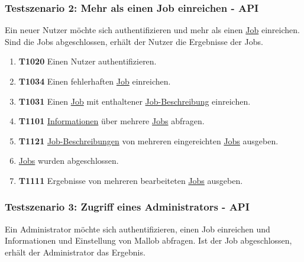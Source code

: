 \subsubsection{Testszenario 2: Mehr als einen Job einreichen - API}
Ein neuer \gls{Nutzer} möchte sich authentifizieren und mehr als einen \hyperref[B:Jobs]{Job} einreichen. Sind die Jobs abgeschlossen, erhält der Nutzer die Ergebnisse der Jobs.

\begin{enumerate}
        
    \item \textbf{T1020} Einen \gls{Nutzer} authentifizieren.
    
    \item \textbf{T1034} Einen fehlerhaften \hyperref[B:Jobs]{Job} einreichen.
        
    \item \textbf{T1031} Einen \hyperref[B:Jobs]{Job} mit enthaltener \hyperref[B:Job-Beschreibung]{Job-Beschreibung} einreichen.
    
    \item \textbf{T1101} \hyperref[B:Job-Informationen]{Informationen} über mehrere \hyperref[B:Jobs]{Jobs} abfragen. 
    
    \item \textbf{T1121} \hyperref[B:Job-Beschreibung]{Job-Beschreibungen} von mehreren eingereichten \hyperref[B:Jobs]{Jobs} ausgeben.
    
    \item \hyperref[B:Jobs]{Jobs} wurden abgeschlossen.
    
    \item \textbf{T1111} Ergebnisse von mehreren bearbeiteten \hyperref[B:Jobs]{Jobs} ausgeben. 
\end{enumerate}

\subsubsection{Testszenario 3: Zugriff eines Administrators - API}
Ein \gls{Administrator} möchte sich authentifizieren, einen Job einreichen und Informationen und Einstellung von \gls{Mallob} abfragen. Ist der Job abgeschlossen, erhält der Administrator das Ergebnis.

